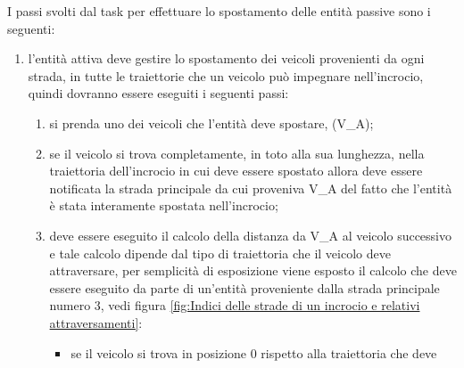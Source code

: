 I passi svolti dal task per effettuare lo spostamento delle entità passive sono
i seguenti:
\begin{enumerate}
\item l'entità attiva deve gestire lo spostamento dei veicoli provenienti da ogni strada, in tutte le traiettorie che un veicolo può impegnare nell'incrocio, quindi dovranno essere eseguiti i seguenti passi:
\begin{enumerate}
\item si prenda uno dei veicoli che l'entità deve spostare, (V\_A);
\item se il veicolo si trova completamente, in toto alla sua lunghezza, nella traiettoria dell'incrocio in cui deve essere spostato allora deve essere notificata la strada principale da cui proveniva V\_A del fatto che l'entità è stata interamente spostata nell'incrocio;
\item deve essere eseguito il calcolo della distanza da V\_A al veicolo successivo e tale calcolo dipende dal tipo di traiettoria che il veicolo deve attraversare, per semplicità di esposizione viene esposto il calcolo che deve essere eseguito da parte di un'entità proveniente dalla strada principale numero 3, vedi figura \ref{fig:Indici delle strade di un incrocio e relativi attraversamenti}:
\begin{itemize}
\item se il veicolo si trova in posizione 0 rispetto alla traiettoria che deve

\end{itemize}
\end{enumerate}
\end{enumerate}
